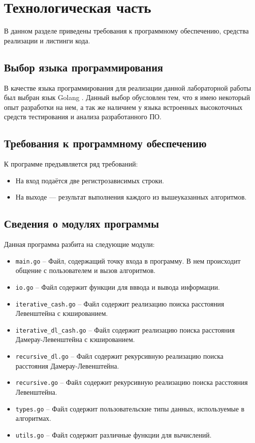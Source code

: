 \chapter{Технологическая часть}

В данном разделе приведены требования к программному обеспечению, средства реализации и листинги кода.

\section{Выбор языка программирования}

В качестве языка программирования для реализации данной лабораторной работы был выбран язык Golang \cite{golang}. Данный выбор обусловлен тем, что я имею некоторый опыт разработки на нем, а так же наличием у языка встроенных высокоточных средств тестирования и анализа разработанного ПО.

\section{Требования к программному обеспечению}

К программе предъявляется ряд требований:
\begin{itemize}
	\item На вход подаётся две регистрозависимых строки.
	\item На выходе — результат выполнения каждого из вышеуказанных алгоритмов.
\end{itemize}

\section{Сведения о модулях программы}

Данная программа разбита на следующие модули:
\begin{itemize}
\item \texttt{main.go} -- Файл, содержащий точку входа в программу. В нем происходит общение с пользователем и вызов алгоритмов.
\item \texttt{io.go} -- Файл содержит функции для вввода и вывода информации.
\item \texttt{iterative\_cash.go} -- Файл содержит реализацию поиска расстояния Левенштейна с кэшированием.
\item \texttt{iterative\_dl\_cash.go} -- Файл содержит реализацию поиска расстояния Дамерау-Левенштейна с кэшированием.
\item \texttt{recursive\_dl.go} -- Файл содержит рекурсивную реализацию поиска расстояния Дамерау-Левенштейна.
\item \texttt{recursive.go} -- Файл содержит рекурсивную реализацию поиска расстояния Левенштейна.
\item \texttt{types.go} -- Файл содержит пользовательские типы данных, используемые в алгоритмах.
\item \texttt{utils.go} -- Файл содержит различные функции для вычислений.
\end{itemize}


